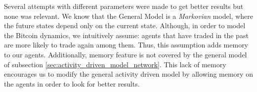 \documentclass[../../thesis.tex]{subfiles}
\begin{document}
Several attempts with different parameters were made to get better results but none was relevant. We know that the General Model is a \textit{Markovian} model, where the future states depend only on the current state. Although, in order to model the Bitcoin dynamics, we intuitively assume: agents that have traded in the past are more likely to trade again among them. Thus, this assumption adds memory to our agents. Additionally, memory feature is not covered by the general model of subsection \ref{sec:activity_driven_model_network}. This lack of memory encourages us to modify the general activity driven model by allowing memory on the agents in order to look for better results.
\end{document}
